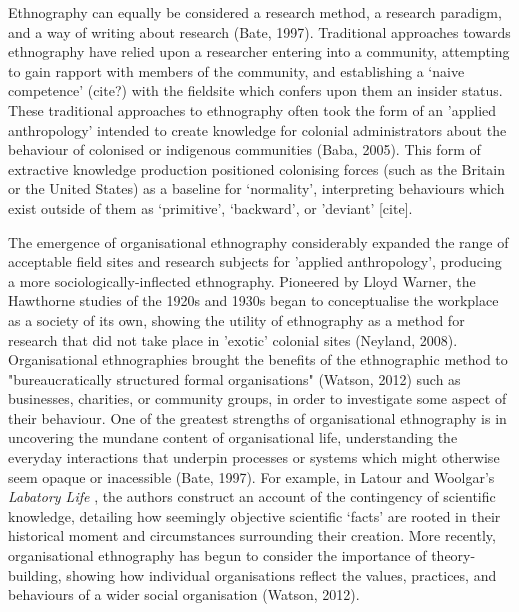 Ethnography can equally be considered a research method, a research paradigm, and a way of writing about research (Bate, 1997). Traditional approaches towards ethnography have relied upon a researcher entering into a community, attempting to gain rapport with members of the community, and establishing a ‘naive competence’ (cite?) with the fieldsite which confers upon them an insider status.  These traditional approaches to ethnography often took the form of an 'applied anthropology' intended to create knowledge for colonial administrators about the behaviour of colonised or indigenous communities (Baba, 2005).  This form of extractive knowledge production positioned colonising forces (such as the Britain or the United States) as a baseline for ‘normality’, interpreting behaviours which exist outside of them as ‘primitive’, ‘backward’, or 'deviant' [cite]. 

The emergence of organisational ethnography considerably expanded the range of acceptable field sites and research subjects for 'applied anthropology', producing a more sociologically-inflected ethnography. Pioneered by Lloyd Warner, the Hawthorne studies of the 1920s and 1930s began to conceptualise the workplace as a society of its own, showing the utility of ethnography as a method for research that did not take place in 'exotic' colonial sites (Neyland, 2008). Organisational ethnographies brought the benefits of the ethnographic method to "bureaucratically structured formal organisations" (Watson, 2012) such as businesses, charities, or community groups, in order to investigate some aspect of their behaviour. One of the greatest strengths of organisational ethnography is in uncovering the mundane content of organisational life, understanding the everyday interactions that underpin processes or systems which might otherwise seem opaque or inacessible (Bate, 1997). For example, in Latour and Woolgar's \textit{Labatory Life} \cite{latour_laboratory_1986}, the authors construct an account of the contingency of scientific knowledge, detailing how seemingly objective scientific ‘facts’ are rooted in their historical moment and circumstances surrounding their creation. More recently, organisational ethnography has begun to consider the importance of theory-building, showing how individual organisations reflect the values, practices, and behaviours of a wider social organisation (Watson, 2012). 

